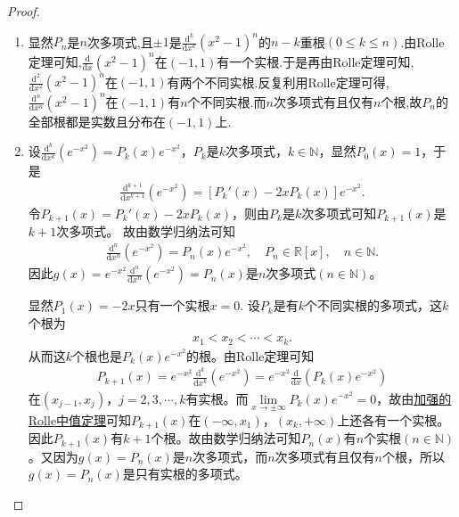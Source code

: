 \documentclass[../../main.tex]{subfiles}%
\begin{document}
\begin{proof}
\begin{enumerate}
\item 显然$P_n$是$n$次多项式,且$\pm 1$是$\frac{\mathrm{d}^k}{\mathrm{d}x^k}(x^2-1)^n$的$n-k$重根$(0\leqslant k\leqslant n)$.由Rolle定理可知,$\frac{\mathrm{d}}{\mathrm{d}x}(x^2-1)^n$在$(-1,1)$有一个实根.于是再由Rolle定理可知,$\frac{\mathrm{d}^2}{\mathrm{d}x^2}(x^2-1)^n$在$(-1,1)$有两个不同实根.反复利用Rolle定理可得,$\frac{\mathrm{d}^n}{\mathrm{d}x^n}(x^2-1)^n$在$(-1,1)$有$n$个不同实根.而$n$次多项式有且仅有$n$个根,故$P_n$的全部根都是实数且分布在$(-1,1)$上.

\item 设$\frac{\mathrm{d}^k}{\mathrm{d}x^k}(e^{-x^2}) = P_k(x)e^{-x^2}$，$P_k$是$k$次多项式，$k\in \mathbb{N}$，显然$P_0(x) = 1$，于是
\begin{align*}
\frac{\mathrm{d}^{k+1}}{\mathrm{d}x^{k+1}}(e^{-x^2}) = \left[ P_k'(x) - 2xP_k(x) \right] e^{-x^2}.
\end{align*}
令$P_{k+1}(x) = P_k'(x) - 2xP_k(x)$，则由$P_k$是$k$次多项式可知$P_{k+1}(x)$是$k+1$次多项式。
故由数学归纳法可知
\begin{align*}
\frac{\mathrm{d}^n}{\mathrm{d}x^n}(e^{-x^2}) = P_n(x)e^{-x^2}, \quad P_n \in \mathbb{R}[x], \quad n \in \mathbb{N}.
\end{align*}
因此$g(x) = e^{-x^2}\frac{\mathrm{d}^n}{\mathrm{d}x^n}(e^{-x^2}) = P_n(x)$是$n$次多项式$(n \in \mathbb{N})$。

显然$P_1(x)=-2x$只有一个实根$x=0$.
设$P_k$是有$k$个不同实根的多项式，这$k$个根为
\begin{align*}
x_1 < x_2 < \cdots < x_k.
\end{align*}
从而这$k$个根也是$P_k(x)e^{-x^2}$的根。由Rolle定理可知
\begin{align*}
P_{k+1}(x) = e^{-x^2}\frac{\mathrm{d}^k}{\mathrm{d}x^k}(e^{-x^2}) = e^{-x^2}\frac{\mathrm{d}}{\mathrm{d}x}\left( P_k(x)e^{-x^2} \right)
\end{align*}
在$(x_{j-1}, x_j)$，$j=2,3,\cdots,k$有实根。而$\lim\limits_{x \rightarrow \pm \infty} P_k(x)e^{-x^2} = 0$，故由\hyperref[theorem:加强的Rolle中值定理]{加强的Rolle中值定理}可知$P_{k+1}(x)$在$(-\infty, x_1)$，$(x_k, +\infty)$上还各有一个实根。因此$P_{k+1}(x)$有$k+1$个根。故由数学归纳法可知$P_n(x)$有$n$个实根$(n \in \mathbb{N})$。又因为$g(x) = P_n(x)$是$n$次多项式，而$n$次多项式有且仅有$n$个根，所以$g(x) = P_n(x)$是只有实根的多项式。
\end{enumerate}
\end{proof}
\end{document}
